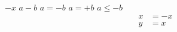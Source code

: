 \documentclass{article}
\begin{document}
\(-x\)
\(a-b\)
\(a=-b\)
\(a=+b\)
\(a\leq -b\)
\begin{align*}
x &= -x\\
y &= x
\end{align*}
\end{document}
